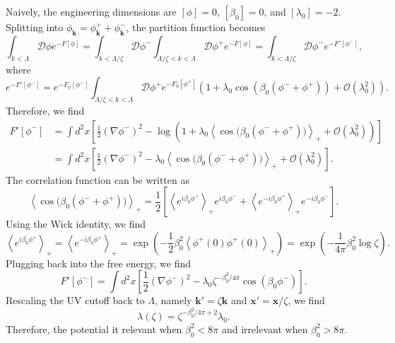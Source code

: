 \begin{solution}
    Naively, the engineering dimensions are $[\phi] = 0$, $[\beta_0] = 0$, and $[\lambda_0 ] = -2$. Splitting into $\phi_\mathbf{k} = \phi_\mathbf{k}^+ + \phi_\mathbf{k}^-$, the partition function becomes
    \begin{equation}
        \int_{k <\Lambda}\mathcal{D}\phi e^{-F[\phi]} = \int_{k <\Lambda/\zeta}\mathcal{D}\phi^- \int_{\Lambda/\zeta< k <\Lambda}\mathcal{D}\phi^+ e^{-F[\phi]}  =\int_{k <\Lambda/\zeta}\mathcal{D}\phi^- e^{-F'[\phi^-]},
    \end{equation}
    where
    \begin{equation}
        e^{-F'[\phi^-]} =  e^{-F_0[\phi^-]}\int_{\Lambda/\zeta< k <\Lambda}\mathcal{D}\phi^+ e^{-F_0[\phi^+]}\left(1 + \lambda_0\cos(\beta_0(\phi^-+\phi^+)) + \mathcal{O}(\lambda_0^2)\right).
    \end{equation}
    Therefore, we find
    \begin{equation}
    \begin{aligned}
        F'[\phi^-]&= \int d^2x\left[
    \frac12(\nabla\phi^-)^2 - \log \left(1 + \lambda_0\left\langle
    \cos\bigl(\beta_0(\phi^-+\phi^+)\bigr)
    \right\rangle_+ + \mathcal{O}(\lambda_0^2)\right)\right]\\&= \int d^2x\left[
    \frac12(\nabla\phi^-)^2
    -\lambda_0\left\langle
    \cos\bigl(\beta_0(\phi^-+\phi^+)\bigr)
    \right\rangle_+ + \mathcal{O}(\lambda_0^2)\right].
    \end{aligned}
    \end{equation}
    The correlation function can be written as
    \begin{equation}
        \left\langle
    \cos\bigl(\beta_0(\phi^-+\phi^+)\bigr)
    \right\rangle_+ = \frac{1}{2}\left[\left\langle
    e^{i\beta_0\phi^+}\right\rangle_+e^{i\beta_0\phi^-} + \left\langle
    e^{-i\beta_0\phi^+}\right\rangle_+e^{-i\beta_0\phi^-}\right].
    \end{equation}
    Using the Wick identity, we find
    \begin{equation}
        \left\langle
    e^{i\beta_0\phi^+}\right\rangle_+ = \left\langle
    e^{-i\beta_0\phi^+}\right\rangle_+ = \exp\left(-\frac{1}{2}\beta_0^2\left\langle
    \phi^+(0)\phi^+(0)\right\rangle_+\right) =\exp\left(-\frac{1}{4\pi}\beta_0^2
    \log\zeta \right).
    \end{equation}
    Plugging back into the free energy, we find
    \begin{equation}
        F'[\phi^-] = \int d^2x\left[\frac{1}{2}(\nabla\phi^-)^2 - \lambda_0\zeta^{-\beta_0^2/4\pi}\cos(\beta_0\phi^-)\right].
    \end{equation}
    Rescaling the UV cutoff back to $\Lambda$, namely $\mathbf{k}' = \zeta\mathbf{k}$ and $\mathbf{x}' = \mathbf{x}/\zeta$, we find
    \begin{equation}
        \lambda(\zeta) = \zeta^{-\beta_0^2/4\pi +2}\lambda_0.
    \end{equation}
    Therefore, the potential it relevant when $\beta_0^2 < 8\pi$ and irrelevant when $\beta_0^2 > 8\pi$.
\end{solution}

